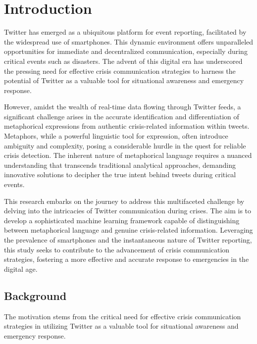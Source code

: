 \chapter{Introduction}
\label{ch:into} %

Twitter has emerged as a ubiquitous platform for event reporting, facilitated by the widespread 
use of smartphones. This dynamic environment offers unparalleled opportunities for immediate 
and decentralized communication, especially during critical events such as disasters. The 
advent of this digital era has underscored the pressing need for effective crisis communication 
strategies to harness the potential of Twitter as a valuable tool for situational awareness and 
emergency response.

However, amidst the wealth of real-time data flowing through Twitter feeds, a significant 
challenge arises in the accurate identification and differentiation of metaphorical expressions 
from authentic crisis-related information within tweets. Metaphors, while a powerful linguistic 
tool for expression, often introduce ambiguity and complexity, posing a considerable hurdle in 
the quest for reliable crisis detection. The inherent nature of metaphorical language requires 
a nuanced understanding that transcends traditional analytical approaches, demanding innovative 
solutions to decipher the true intent behind tweets during critical events.

This research embarks on the journey to address this multifaceted challenge by delving into the 
intricacies of Twitter communication during crises. The aim is to develop a sophisticated 
machine learning framework capable of distinguishing between metaphorical language and genuine 
crisis-related information. Leveraging the prevalence of smartphones and the instantaneous 
nature of Twitter reporting, this study seeks to contribute to the advancement of crisis 
communication strategies, fostering a more effective and accurate response to emergencies in 
the digital age.

\section{Background}
\label{sec:into_back}
The motivation stems from the critical need for effective crisis communication strategies in 
utilizing Twitter as a valuable tool for situational awareness and emergency response.


